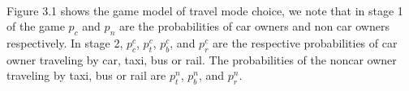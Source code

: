 \paragraph{}Figure 3.1 shows the game model of travel mode choice, we note that in stage 1 of the game $p_c$ and $p_n$ are the probabilities of car owners and non car owners respectively. In stage 2, $p^c_{c}$, $p^{c}_{t}$, $p^c_{b}$, and $p^c_{r}$ are the respective probabilities of car owner traveling by car, taxi, bus or rail. The probabilities of the noncar owner traveling by taxi, bus or rail are $p^n_{t}$, $p^n_{b}$, and $p^n_{r}$.
